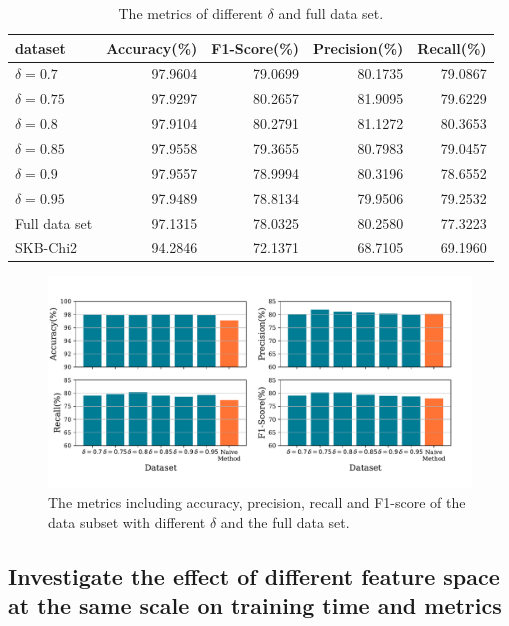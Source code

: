 \documentclass{ieeeaccess}
\theoremstyle{definition}
\begin{document}
\begin{table}
    \centering
    \caption{The metrics of different $\delta$ and full data set.}
    \label{tab:metric-full}
    \begin{tabular}{lrrrr}
        \toprule
        dataset & Accuracy(\%) & F1-Score(\%) & Precision(\%) & Recall(\%) \\
        \midrule
            $\delta=0.7$ &  97.9604 & 79.0699 & 80.1735 & 79.0867 \\
            $\delta=0.75$ &	97.9297 & 80.2657 & 81.9095 & 79.6229 \\
            $\delta=0.8$ &	97.9104 & 80.2791 & 81.1272 & 80.3653 \\
            $\delta=0.85$ &	97.9558 & 79.3655 & 80.7983 & 79.0457 \\
            $\delta=0.9$ &  97.9557 & 78.9994 & 80.3196 & 78.6552 \\
            $\delta=0.95$ &	97.9489 & 78.8134 & 79.9506 & 79.2532 \\
            Full data set &	97.1315 & 78.0325 & 80.2580 & 77.3223 \\
            SKB-Chi2 & 94.2846 & 72.1371 & 68.7105 & 69.1960 \\
        \bottomrule
    \end{tabular}
\end{table}

\begin{figure}[!htpb]
    \centering
    \includegraphics[scale=0.35]{fig/metrics-full.pdf}
    \caption{The metrics including accuracy, precision, recall and F1-score of the data subset with different $\delta$ and the full data set.}
    \label{fig:metrics-full}
\end{figure}

\subsection{Investigate the effect of different feature space at the same scale on training time and metrics}
\end{document}
